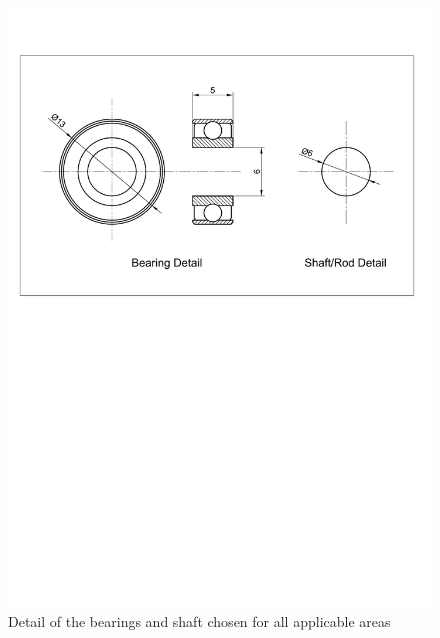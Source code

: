         \begin{figure}[h!]
          \centering
          \includegraphics[clip, trim=2cm 16cm 2cm 3cm, width=0.7\linewidth]{figures/bearing-shaft-detail}
          \caption[Detail of the bearings and shaft chosen for all applicable areas]{Detail of the bearings and shaft chosen for all applicable areas}
          \label{fig:mechDesign-bearingShaftDetail}
        \end{figure}        
        
